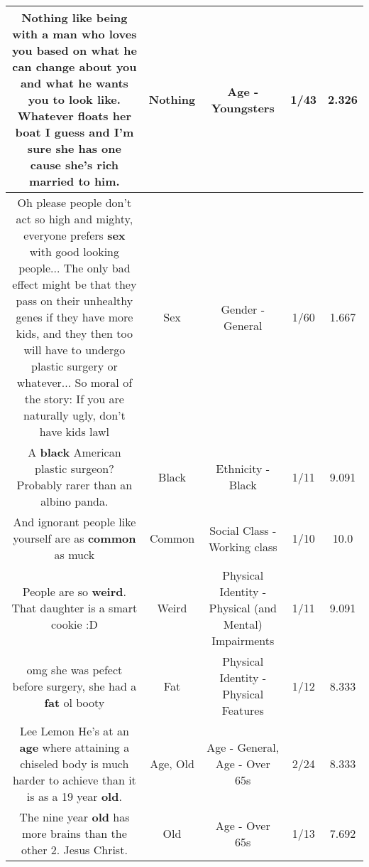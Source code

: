 \documentclass[11pt]{article}
\newlength\mylength
\begin{document}
\begin{center}
\begin{longtable}{|C{.65\mylength}|C{.30\mylength}|C{.12\mylength}|C{.12\mylength}|C{.12\mylength}|}
  \small Nothing like being with a man who loves you based on what he can change about you and what he wants you to look like. Whatever floats her boat I guess and I'm sure she has one cause she's rich married to him.\normalsize   & Nothing & Age - Youngsters & 1/43 & 2.326 \\  \hline
  \small Oh please people don't act so high and mighty, everyone prefers \textbf{sex} with good looking people... The only bad effect might be that they pass on their unhealthy genes if they have more kids, and they then too will have to undergo plastic surgery or whatever... So moral of the story: If you are naturally ugly, don't have kids lawl\normalsize   & Sex & Gender - General & 1/60 & 1.667 \\  \hline
  \small A \textbf{black} American plastic surgeon? Probably rarer than an albino panda.\normalsize   & Black & Ethnicity - Black & 1/11 & 9.091 \\  \hline
  \small And ignorant people like yourself are as \textbf{common} as muck\normalsize   & Common & Social Class - Working class & 1/10 & 10.0 \\  \hline
  \small People are so \textbf{weird}. That daughter is a smart cookie :D\normalsize   & Weird & Physical Identity - Physical (and Mental) Impairments & 1/11 & 9.091 \\  \hline
  \small omg she was pefect before surgery, she had a \textbf{fat} ol booty\normalsize   & Fat & Physical Identity - Physical Features & 1/12 & 8.333 \\  \hline
  \small Lee Lemon He's at an \textbf{age} where attaining a chiseled body is much harder to achieve than it is as a 19 year \textbf{old}.\normalsize   & Age, Old & Age - General, Age - Over 65s & 2/24 & 8.333 \\  \hline
  \small The nine year \textbf{old} has more brains than the other 2. Jesus Christ.\normalsize   & Old & Age - Over 65s & 1/13 & 7.692 \\  \hline

\end{longtable}
\end{center}
\end{document}
